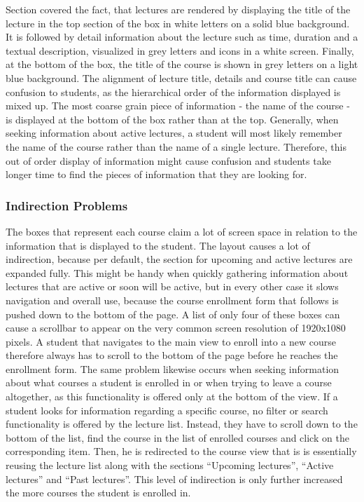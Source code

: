Section \todosct covered the fact, that lectures are rendered by displaying the title of the lecture in the top section of the box in white letters on a solid blue background. It is followed by detail information about the lecture such as time, duration and a textual description, visualized in grey letters and icons in a white screen. Finally, at the bottom of the box, the title of the course is shown in grey letters on a light blue background. The alignment of lecture title, details and course title can cause confusion to students, as the hierarchical order of the information displayed is mixed up. The most coarse grain piece of information - the name of the course - is displayed at the bottom of the box rather than at the top. Generally, when seeking information about active lectures, a student will most likely remember the name of the course rather than the name of a single lecture. Therefore, this out of order display of information might cause confusion and students take longer time to find the pieces of information that they are looking for.

\subsubsection{Indirection Problems}

The boxes that represent each course claim a lot of screen space in relation to the information that is displayed to the student. The layout causes a lot of indirection, because per default, the section for upcoming and active lectures are expanded fully. This might be handy when quickly gathering information about lectures that are active or soon will be active, but in every other case it slows navigation and overall use, because the course enrollment form that follows is pushed down to the bottom of the page.
A list of only four of these boxes can cause a scrollbar to appear on the very common screen resolution of 1920x1080 pixels. A student that navigates to the main view to enroll into a new course therefore always has to scroll to the bottom of the page before he reaches the enrollment form. The same problem likewise occurs when seeking information about what courses a student is enrolled in or when trying to leave a course altogether, as this functionality is offered only at the bottom of the view. If a student looks for information regarding a specific course, no filter or search functionality is offered by the lecture list. Instead, they have to scroll down to the bottom of the list, find the course in the list of enrolled courses and click on the corresponding item. Then, he is redirected to  the course view that is is essentially reusing the lecture list along with the sections “Upcoming lectures”, “Active lectures” and “Past lectures”. This level of indirection is only further increased the more courses the student is enrolled in. 

